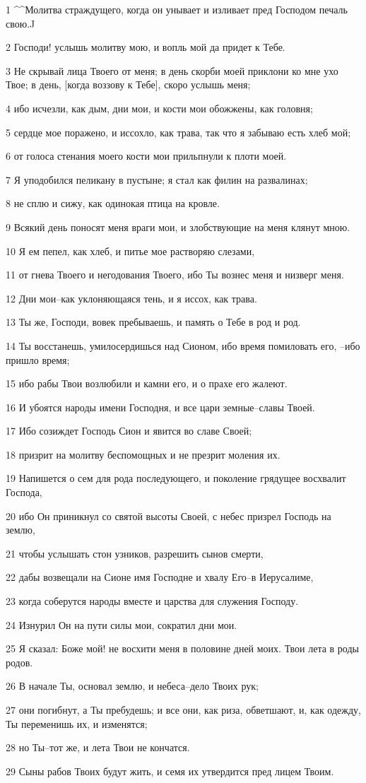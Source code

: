 \par 1 ^^Молитва страждущего, когда он унывает и изливает пред Господом печаль свою.^^
\par 2 Господи! услышь молитву мою, и вопль мой да придет к Тебе.
\par 3 Не скрывай лица Твоего от меня; в день скорби моей приклони ко мне ухо Твое; в день, [когда воззову к Тебе], скоро услышь меня;
\par 4 ибо исчезли, как дым, дни мои, и кости мои обожжены, как головня;
\par 5 сердце мое поражено, и иссохло, как трава, так что я забываю есть хлеб мой;
\par 6 от голоса стенания моего кости мои прильпнули к плоти моей.
\par 7 Я уподобился пеликану в пустыне; я стал как филин на развалинах;
\par 8 не сплю и сижу, как одинокая птица на кровле.
\par 9 Всякий день поносят меня враги мои, и злобствующие на меня клянут мною.
\par 10 Я ем пепел, как хлеб, и питье мое растворяю слезами,
\par 11 от гнева Твоего и негодования Твоего, ибо Ты вознес меня и низверг меня.
\par 12 Дни мои--как уклоняющаяся тень, и я иссох, как трава.
\par 13 Ты же, Господи, вовек пребываешь, и память о Тебе в род и род.
\par 14 Ты восстанешь, умилосердишься над Сионом, ибо время помиловать его, --ибо пришло время;
\par 15 ибо рабы Твои возлюбили и камни его, и о прахе его жалеют.
\par 16 И убоятся народы имени Господня, и все цари земные--славы Твоей.
\par 17 Ибо созиждет Господь Сион и явится во славе Своей;
\par 18 призрит на молитву беспомощных и не презрит моления их.
\par 19 Напишется о сем для рода последующего, и поколение грядущее восхвалит Господа,
\par 20 ибо Он приникнул со святой высоты Своей, с небес призрел Господь на землю,
\par 21 чтобы услышать стон узников, разрешить сынов смерти,
\par 22 дабы возвещали на Сионе имя Господне и хвалу Его--в Иерусалиме,
\par 23 когда соберутся народы вместе и царства для служения Господу.
\par 24 Изнурил Он на пути силы мои, сократил дни мои.
\par 25 Я сказал: Боже мой! не восхити меня в половине дней моих. Твои лета в роды родов.
\par 26 В начале Ты, основал землю, и небеса--дело Твоих рук;
\par 27 они погибнут, а Ты пребудешь; и все они, как риза, обветшают, и, как одежду, Ты переменишь их, и изменятся;
\par 28 но Ты--тот же, и лета Твои не кончатся.
\par 29 Сыны рабов Твоих будут жить, и семя их утвердится пред лицем Твоим.

